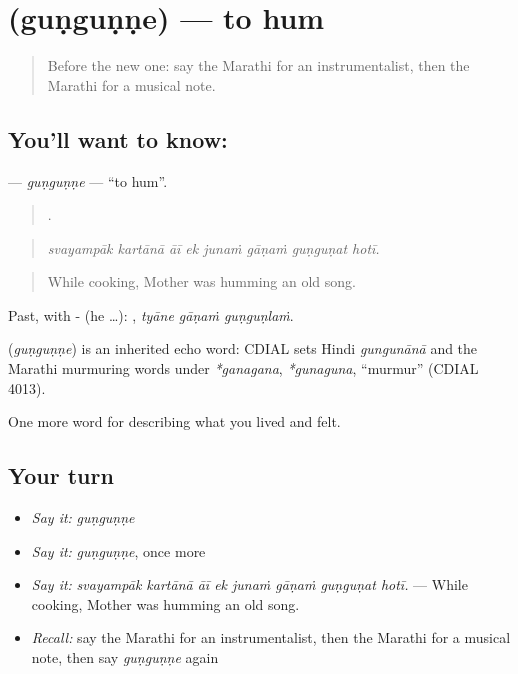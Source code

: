 \section[\texorpdfstring{\mr{गुणगुणणे} (guṇguṇṇe)}{गुणगुणणे (guṇguṇṇe)}]{ (guṇguṇṇe) — to hum}

\label{lesson:MR-C536-gungunne}



\begin{quote}
Before the new one: say the Marathi for an instrumentalist, then the Marathi for a musical note.
\end{quote}

\subsection*{You'll want to know: }
\textbf{} — \emph{guṇguṇṇe} — \textquotedblleft{}to hum\textquotedblright{}.

\begin{quote}
       .
\end{quote}

\begin{quote}
\emph{svayampāk kartānā āī ek junaṁ gāṇaṁ guṇguṇat hotī.}
\end{quote}

\begin{quote}
While cooking, Mother was humming an old song.
\end{quote}

Past, with - (he …):   , \emph{tyāne gāṇaṁ guṇguṇlaṁ}.

\begin{cousinweb}
\textbf{} (\emph{guṇguṇṇe}) is an inherited echo word: CDIAL sets Hindi \emph{gungunānā} and the Marathi murmuring words under \emph{*ganagana}, \emph{*gunaguna}, \textquotedblleft{}murmur\textquotedblright{} (CDIAL 4013).
\end{cousinweb}

\begin{grammarlens}[title={What you've built}]
One more word for describing what you lived and felt.
\end{grammarlens}

\subsection*{Your turn}
\begin{itemize}
\raggedright
  \item \emph{Say it:} \emph{guṇguṇṇe}
  \item \emph{Say it:} \emph{guṇguṇṇe}, once more
  \item \emph{Say it:} \emph{svayampāk kartānā āī ek junaṁ gāṇaṁ guṇguṇat hotī.} — While cooking, Mother was humming an old song.
  \item \emph{Recall:} say the Marathi for an instrumentalist, then the Marathi for a musical note, then say \emph{guṇguṇṇe} again
\end{itemize}

